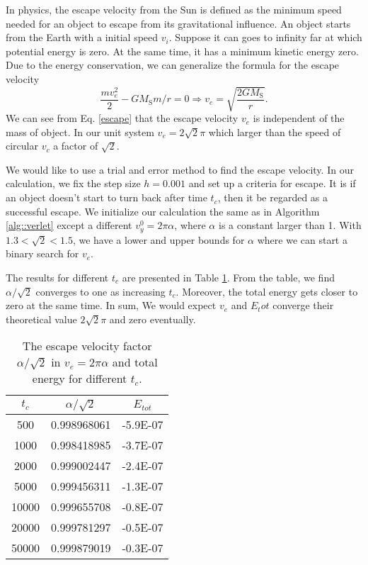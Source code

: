 In physics, the escape velocity from the Sun is defined as the minimum speed needed for an object to escape from its gravitational influence.
An object starts from the Earth with a initial speed $v_i$. 
Suppose it can goes to infinity far at which potential energy is zero. 
At the same time, it has a minimum kinetic energy zero.
Due to the energy conservation, we can generalize the formula for the escape velocity
\begin{equation}
	\label{escape}
	\frac{mv_e^2}{2} - GM_{\mathrm{S}}m/r = 0\Longrightarrow v_e = \sqrt{\frac{2GM_{\mathrm{S}}}{r}}.
\end{equation}
We can see from Eq. \ref{escape} that the escape velocity $v_e$ is independent of the mass of object.
In our unit system $v_e = 2\sqrt{2}\pi$ which larger than the speed of circular $v_c$ a factor of $\sqrt{2}$.

We would like to use a trial and error method to find the escape velocity.
In our calculation, we fix the step size $h=0.001$ and set up a criteria for escape.
It is if an object doesn't start to turn back after time $t_c$, then it be regarded as a successful escape.
We initialize our calculation the same as in Algorithm \ref{alg::verlet} except a different $v_{y}^0=2\pi \alpha$, where $\alpha$ is a constant larger than 1.
With $1.3<\sqrt{2}<1.5$, we have a lower and upper bounds for $\alpha$ where we can start a binary search for $v_e$.

The results for different $t_c$ are presented in Table \ref{tab::escape}. 
From the table, we find $\alpha/\sqrt{2}$ converges to one as increasing $t_c$. 
Moreover, the total energy gets closer to zero at the same time.
In sum, We would expect $v_e$ and $E_tot$ converge their theoretical value $2\sqrt{2}\pi$ and zero eventually. 

\begin{table}[tb]
	\centering
	\caption{The escape velocity factor $\alpha/\sqrt{2}$ in $v_e=2\pi \alpha$ and total energy for different $t_c$.}
	\label{my-label}
	\label{tab::escape}
	\begin{tabular}{ccc}
	\hline
	\hline
	$t_c$  & $\alpha/\sqrt{2}$          & $E_{tot}$          \\
	\hline
	500   & 0.998968061 & -5.9E-07 \\
	1000  & 0.998418985 & -3.7E-07 \\
	2000  & 0.999002447 & -2.4E-07 \\
	5000  & 0.999456311 & -1.3E-07 \\
	10000 & 0.999655708 & -0.8E-07 \\
	20000 & 0.999781297 & -0.5E-07 \\
	50000 & 0.999879019 & -0.3E-07\\
	\hline
	\hline
	\end{tabular}
\end{table}
	
